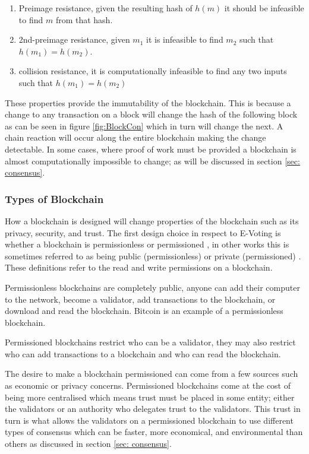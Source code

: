 \documentclass{entcs}
\begin{document}
\begin{enumerate}
    \item Preimage resistance, given the resulting hash of \(h(m)\) it should be infeasible to find \(m\) from that hash. 
    \item 2nd-preimage resistance, given \(m_1\) it is infeasible to find \(m_2\) such that \(h(m_1) = h(m_2)\).
    \item collision resistance, it is computationally infeasible to find any two inputs such that \(h(m_1) = h(m_2)\)
\end{enumerate}

These properties provide the immutability of the blockchain. This is because a change to any transaction on a block will change the hash of the following block as can be seen in figure \ref{fig:BlockCon} which in turn will change the next. A chain reaction will occur along the entire blockchain making the change detectable. In some cases, where proof of work must be provided a blockchain is almost computationally impossible to change; as will be discussed in section \ref{sec: consensus}.

\subsubsection{Types of Blockchain}
How a blockchain is designed will change properties of the blockchain such as its privacy, security, and trust. The first design choice in respect to E-Voting is whether a blockchain is permissionless or permissioned \cite{wust2018need}, in other works this is sometimes referred to as being public (permissionless) or private (permissioned) \cite{blockchainBeginners}. These definitions refer to the read and write permissions on a blockchain. 

Permissionless blockchains are completely public, anyone can add their computer to the network, become a validator, add transactions to the blockchain, or download and read the blockchain. Bitcoin is an example of a permissionless blockchain.

Permissioned blockchains restrict who can be a validator, they may also restrict who can add transactions to a blockchain and who can read the blockchain. 

The desire to make a blockchain permissioned can come from a few sources such as economic or privacy concerns. Permissioned blockchains come at the cost of being more centralised which means trust must be placed in some entity; either the validators or an authority who delegates trust to the validators. This trust in turn is what allows the validators on a permissioned blockchain to use different types of consensus which can be faster, more economical, and environmental than others as discussed in section \ref{sec: consensus}.
\end{document}
